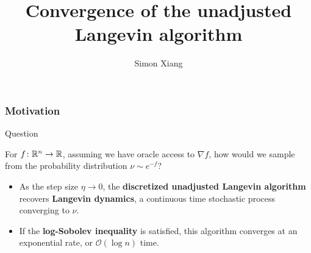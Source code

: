 \documentclass[xcolor=dvipsnames]{beamer}
\title{Convergence of the unadjusted Langevin algorithm}
\subtitle{}
\author{Simon Xiang}
\institute{University of Texas at Austin}
\begin{document}
 
    \begin{frame}
        \titlepage
    \end{frame}


    \begin{frame}
        \frametitle{Motivation} 
        \begin{exampleblock}{Question} 

        For $f \colon \mathbb{R}^n   \to \mathbb{R}$, assuming we have oracle access to $\nabla f$, how would we sample from the probability distribution $\nu \sim e ^{-f}$?
        \end{exampleblock}
       \begin{itemize}
       \setlength\itemsep{-.2em}
           \item As the step size $\eta \to  0$, the \textbf{discretized unadjusted Langevin algorithm} recovers \textbf{Langevin dynamics}, a continuous time stochastic process converging to $\nu$.
           \item If the \textbf{log-Sobolev inequality} is satisfied, this algorithm converges at an exponential rate, or $\mathcal{O} (\log n)$ time.
       \end{itemize}
    \end{frame}
    
\end{document}
